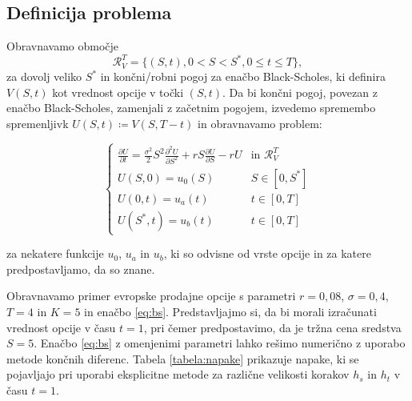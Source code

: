 \documentclass{article}
\theoremstyle{definition}
\newcommand{\parc}[2]{\frac{\partial #1}{\partial #2}}
\begin{document}
\subsection{Definicija problema}

Obravnavamo območje
\begin{equation}
    \mathcal{R}^T_V = \{(S, t), 0 < S < S^*, 0 \leq t \leq T\},
\end{equation}
za dovolj veliko $S^*$ in končni/robni pogoj za enačbo Black-Scholes, ki definira $V(S, t)$ kot vrednost opcije v točki $(S, t)$. Da bi končni pogoj, povezan z enačbo Black-Scholes, zamenjali z začetnim pogojem, izvedemo spremembo spremenljivk $U(S, t) \coloneqq V(S, T - t)$ in obravnavamo problem:

\begin{equation}
    \label{eq:bs}
    \left\{
    \begin{array}{ll}
     \parc{U}{t} = \frac{\sigma^2}{2}S^2 \frac{\partial^{2} U}{\partial S^{2}} + rS \parc{U}{S} - rU  & \text{in } \mathcal{R}^T_V\\[0.5em]
    U(S,0) = u_0(S)      & S \in [0,S^*] \\[0.5em]
    U(0,t) = u_a(t)      & t \in [0,T] \\[0.5em]
    U(S^*,t) = u_b(t)    & t \in [0,T]
    \end{array}
    \right.
\end{equation}
    
za nekatere funkcije $u_0$, $u_a$ in $u_b$, ki so odvisne od vrste opcije in za katere predpostavljamo, da so znane.

Obravnavamo primer evropske prodajne opcije s parametri $r = 0,08$, $\sigma = 0,4$, $T = 4$ in $K = 5$ in enačbo \eqref{eq:bs}. 
Predstavljajmo si, da bi morali izračunati vrednost opcije v času $t = 1$, pri čemer predpostavimo, da je tržna cena sredstva $S = 5$.
Enačbo \eqref{eq:bs} z omenjenimi parametri lahko rešimo numerično z uporabo metode končnih diferenc. 
Tabela \ref{tabela:napake} prikazuje napake, ki se pojavljajo pri uporabi eksplicitne metode za različne velikosti korakov
$h_s$ in $h_t$ v času $t=1$.
\end{document}
